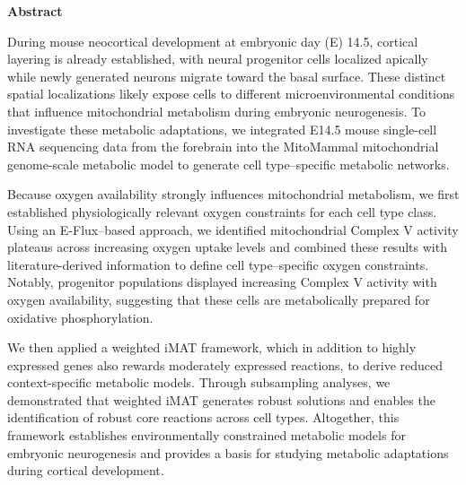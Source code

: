 \newpage
\vspace*{1cm}
\begin{center}
    \textbf{Abstract}
\end{center}
\vspace*{1cm}
During mouse neocortical development at embryonic day (E) 14.5, cortical layering is already established, with neural progenitor cells localized apically while newly generated neurons migrate toward the basal surface. These distinct spatial localizations likely expose cells to different microenvironmental conditions that influence mitochondrial metabolism during embryonic neurogenesis. To investigate these metabolic adaptations, we integrated E14.5 mouse single-cell RNA sequencing data from the forebrain into the MitoMammal \citep{CHAPMANMitoMAMMALGenomeScale2025} mitochondrial genome-scale metabolic model to generate cell type–specific metabolic networks.
\newline

Because oxygen availability strongly influences mitochondrial metabolism, we first established physiologically relevant oxygen constraints for each cell type class. Using an E-Flux–based approach, we identified mitochondrial Complex V activity plateaus across increasing oxygen uptake levels and combined these results with literature-derived information to define cell type–specific oxygen constraints. Notably, progenitor populations displayed increasing Complex V activity with oxygen availability, suggesting that these cells are metabolically prepared for oxidative phosphorylation. 
\newline

We then applied a weighted iMAT framework, which in addition to highly expressed genes also rewards moderately expressed reactions, to derive reduced context-specific metabolic models. Through subsampling analyses, we demonstrated that weighted iMAT generates robust solutions and enables the identification of robust core reactions across cell types. Altogether, this framework establishes environmentally constrained metabolic models for embryonic neurogenesis and provides a basis for studying metabolic adaptations during cortical development. 
